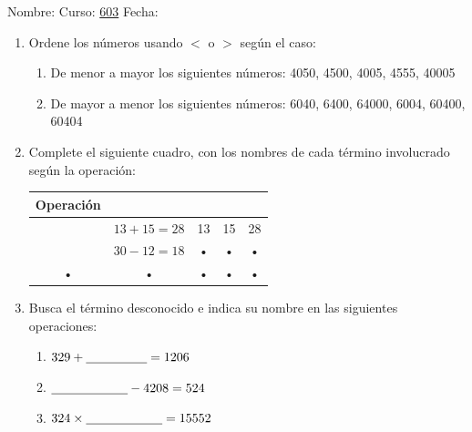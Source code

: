 \documentclass[fleqn]{article}
\newcommand{\LineaNombre}{%
\par
\vspace{\baselineskip}
Nombre:\hrulefill \; Curso: \underline{603} \; Fecha: \underline{\hspace*{2.5cm}} \relax
\par}
\begin{document}
\LineaNombre
\begin{enumerate}
   \item Ordene los números usando $<$ o $>$ según el caso: 
      \begin{enumerate}
	 \item De menor a mayor los siguientes números: 4050, 4500, 4005, 4555, 40005\answer
	 \item De mayor a menor los siguientes números: 6040, 6400, 64000, 6004, 60400, 60404\answer
      \end{enumerate}
  \item Complete el siguiente cuadro, con los nombres de cada término involucrado según la operación:
  \begin{tabular}{|c|c|c|c|c|}
\hline 
Operación &  &  &  &  \\ 
\hline 
 & $13+15=28$ & 13 & 15 & 28 \\ 
\hline 
 & $30-12=18$ & • & • & • \\ 
\hline 
• & • & • & • & • \\ 
\hline 
\end{tabular} 
   \item Busca el término desconocido e indica su nombre en las siguientes operaciones:
   \begin{enumerate}
   \item $329+\underline{\hspace*{48pt}}=1206$\noanswer
   \item $\underline{\hspace*{60pt}}-4208=524$\noanswer
   \item $324\times \underline{\hspace*{60pt}}=15552 $\noanswer
   \end{enumerate}
\end{enumerate}
\end{document}
